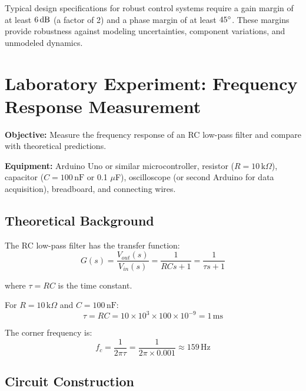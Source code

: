 \begin{designtip}
Typical design specifications for robust control systems require a gain margin of at least $6\,\text{dB}$ (a factor of 2) and a phase margin of at least $45^\circ$. These margins provide robustness against modeling uncertainties, component variations, and unmodeled dynamics.
\end{designtip}

\section{Laboratory Experiment: Frequency Response Measurement}
\label{sec:experiment}

\begin{experimentbox}
\textbf{Objective:} Measure the frequency response of an RC low-pass filter and compare with theoretical predictions.

\textbf{Equipment:} Arduino Uno or similar microcontroller, resistor ($R = 10\,\text{k}\Omega$), capacitor ($C = 100\,\text{nF}$ or 0.1 $\mu$F), oscilloscope (or second Arduino for data acquisition), breadboard, and connecting wires.
\end{experimentbox}

\subsection{Theoretical Background}

The RC low-pass filter has the transfer function:
\begin{equation}
G(s) = \frac{V_{out}(s)}{V_{in}(s)} = \frac{1}{RCs + 1} = \frac{1}{\tau s + 1}
\label{eq:rc_filter}
\end{equation}

where $\tau = RC$ is the time constant.

For $R = 10\,\text{k}\Omega$ and $C = 100\,\text{nF}$:
\begin{equation}
\tau = RC = 10 \times 10^3 \times 100 \times 10^{-9} = 1\,\text{ms}
\end{equation}

The corner frequency is:
\begin{equation}
f_c = \frac{1}{2\pi\tau} = \frac{1}{2\pi \times 0.001} \approx 159\,\text{Hz}
\end{equation}

\subsection{Circuit Construction}

